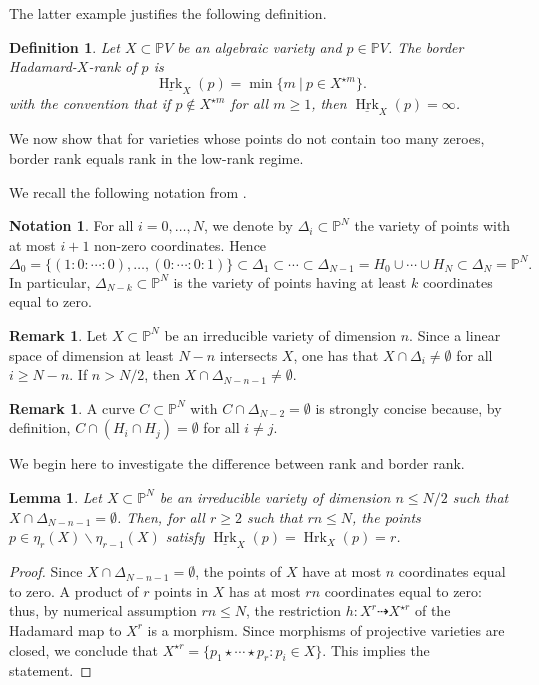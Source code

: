 \documentclass{amsart}
\theoremstyle{plain}
\numberwithin{theorem}{section}
\newtheorem{lemma}[theorem]{Lemma}
\newtheorem{definition}[theorem]{Definition}
\theoremstyle{definition}
\newtheorem{remark}[theorem]{Remark}
\newtheorem*{notation}{Notation}
\newcommand{\bbP}{\mathbb{P}}
\newcommand{\Hrk}{\operatorname{Hrk}}
\begin{document}
The latter example justifies the following definition.

\begin{definition}\label{def:hadamard_borderrank}
    Let $X \subset \bbP V$ be an algebraic variety and $p\in \bbP V$. The {\em border Hadamard-}$X${\em -rank} of $p$ is 
    \[
        \underline{\Hrk}_X(p) = \min \{ m \ | \ p \in X^{\star m} \}.
    \]
    with the convention that if $p \not \in X^{\star m}$ for all $m \geq 1$, then $\underline{\Hrk}_X(p) = \infty$.
\end{definition}

We now show that for varieties whose points do not contain too many zeroes, border rank equals rank in the low-rank regime. 

We recall the following notation from \cite{bocci2024hadamard}.

\begin{notation}
    For all $i = 0,\ldots, N$, we denote by $\Delta_i \subset \bbP^N$ the variety of points with at most $i+1$ non-zero coordinates. Hence
    \[
        \Delta_0 = \{ (1:0:\cdots:0), \ldots, (0:\cdots:0:1)\} \subset \Delta_1 \subset \cdots \subset \Delta_{N-1} = H_0 \cup \cdots \cup H_N \subset \Delta_N = \bbP^N.
    \]
    In particular, $\Delta_{N-k} \subset \bbP^N$ is the variety of points having at least $k$ coordinates equal to zero.
\end{notation}

\begin{remark}
    Let $X \subset \bbP^N$ be an irreducible variety of dimension $n$. Since a linear space of dimension at least $N - n$ intersects $X$, one has that $X \cap \Delta_i \neq \emptyset$ for all $i \geq N-n$. If $n>N/2$, then $X \cap \Delta_{N-n-1} \neq \emptyset$.
\end{remark}

\begin{remark}
\label{rmk:curve}
    A curve $C \subset \bbP^N$ with $C \cap \Delta_{N-2} = \emptyset$ is strongly concise because, by definition, $C \cap (H_i \cap H_j) = \emptyset$ for all $i\neq j$.
\end{remark}
%
We begin here to investigate the difference between rank and border rank.
%
\begin{lemma}
\label{lemma:borderequalsrank}
    Let $X \subset \bbP^N$ be an irreducible variety of dimension $n\leq N/2$ such that $X \cap \Delta_{N-n-1} = \emptyset$. Then, for all $r \geq 2$ such that $rn\leq N$, the points $p \in \eta_r(X) \smallsetminus \eta_{r-1}(X)$ satisfy $\underline{\Hrk}_X(p) = \Hrk_X(p) = r$.
\end{lemma}
\begin{proof}
    Since $X \cap \Delta_{N-n-1} = \emptyset$, the points of $X$ have at most $n$ coordinates equal to zero. A product of $r$ points in $X$ has at most $rn$ coordinates equal to zero: thus, by numerical assumption $rn \leq N$, the restriction $h\colon X^r \dashrightarrow X^{\star r}$ of the Hadamard map to $X^r$ is a morphism. Since morphisms of projective varieties are closed, we conclude that
    $X^{\star r} = \{ p_1 \star \cdots \star p_r : p_i \in X \}.$
    This implies the statement.
\end{proof}
\end{document}
